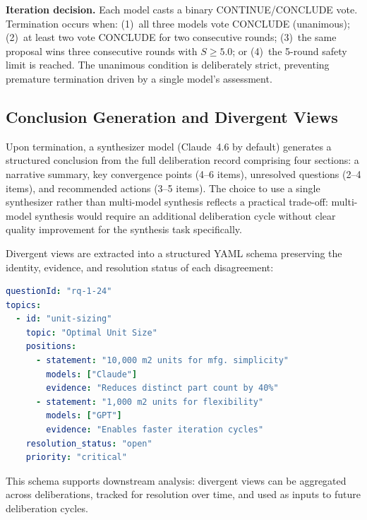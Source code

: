 \documentclass[11pt,a4paper]{article}
\begin{document}
\textbf{Iteration decision.} Each model casts a binary CONTINUE/CONCLUDE vote. Termination occurs when: (1)~all three models vote CONCLUDE (unanimous); (2)~at least two vote CONCLUDE for two consecutive rounds; (3)~the same proposal wins three consecutive rounds with $S \geq 5.0$; or (4)~the 5-round safety limit is reached. The unanimous condition is deliberately strict, preventing premature termination driven by a single model's assessment.

\subsection{Conclusion Generation and Divergent Views}
\label{sec:conclusion_divergent}

Upon termination, a synthesizer model (Claude~4.6 by default) generates a structured conclusion from the full deliberation record comprising four sections: a narrative summary, key convergence points (4--6 items), unresolved questions (2--4 items), and recommended actions (3--5 items). The choice to use a single synthesizer rather than multi-model synthesis reflects a practical trade-off: multi-model synthesis would require an additional deliberation cycle without clear quality improvement for the synthesis task specifically.

Divergent views are extracted into a structured YAML schema preserving the identity, evidence, and resolution status of each disagreement:

\begin{lstlisting}[language=yaml,caption={Divergent views schema with model attribution.}]
questionId: "rq-1-24"
topics:
  - id: "unit-sizing"
    topic: "Optimal Unit Size"
    positions:
      - statement: "10,000 m2 units for mfg. simplicity"
        models: ["Claude"]
        evidence: "Reduces distinct part count by 40%"
      - statement: "1,000 m2 units for flexibility"
        models: ["GPT"]
        evidence: "Enables faster iteration cycles"
    resolution_status: "open"
    priority: "critical"
\end{lstlisting}

This schema supports downstream analysis: divergent views can be aggregated across deliberations, tracked for resolution over time, and used as inputs to future deliberation cycles.
\end{document}
